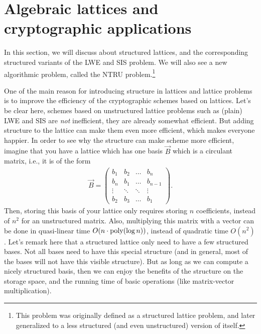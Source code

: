 \section{Algebraic lattices and cryptographic applications}


In this section, we will discuss about structured lattices, and the corresponding structured variants of the LWE and SIS problem. We will also see a new algorithmic problem, called the NTRU problem.\footnote{This problem was originally defined as a structured lattice problem, and later generalized to a less structured (and even unstructured) version of itself.}

One of the main reason for introducing structure in lattices and lattice problems is to improve the efficiency of the cryptographic schemes based on lattices. Let's be clear here, schemes based on unstructured lattice problems such as (plain) LWE and SIS are \emph{not} inefficient, they are already somewhat efficient. But adding structure to the lattice can make them even more efficient, which makes everyone happier.
In order to see why the structure can make scheme more efficient, imagine that you have a lattice which has one basis $\vec B$ which is a circulant matrix, i.e., it is of the form
\begin{align*}
\vec B = \begin{pmatrix}
b_{1} & b_{2} & \dots & b_n \\
b_n & b_1 & \dots & b_{n-1} \\
\vdots & \ddots & \ddots & \vdots \\
b_{2} & b_3 & \dots & b_1
\end{pmatrix}.
\end{align*}
Then, storing this basis of your lattice only requires storing $n$ coefficients, instead of $n^2$ for an unstructured matrix. Also, multiplying this matrix with a vector can be done in quasi-linear time $O(n \cdot \operatorname{poly}( \log n) )$, instead of quadratic time $O(n^2)$.
Let's remark here that a structured lattice only need to have a few structured bases. Not all bases need to have this special structure (and in general, most of the bases will not have this visible structure). But as long as we can compute a nicely structured basis, then we can enjoy the benefits of the structure on the storage space, and the running time of basic operations (like matrix-vector multiplication).

